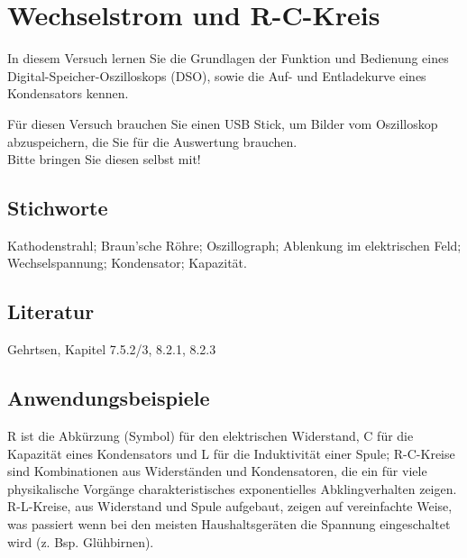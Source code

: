 \chapter{Wechselstrom und R-C-Kreis}
\label{v:15}

In diesem Versuch lernen Sie die Grundlagen der Funktion und Bedienung eines Digital-Speicher-Oszilloskops (DSO), sowie die Auf- und Entladekurve eines Kondensators kennen.

\begin{hint}
	Für diesen Versuch brauchen Sie einen USB Stick, um Bilder vom Oszilloskop abzuspeichern, die Sie für die Auswertung brauchen.\\
	Bitte bringen Sie diesen selbst mit!
\end{hint}

\section{Stichworte}

Kathodenstrahl; Braun'sche Röhre; Oszillograph; Ablenkung im elektrischen Feld; Wechselspannung; Kondensator; Kapazität.
%
\section{Literatur}

Gehrtsen, Kapitel 7.5.2/3, 8.2.1, 8.2.3
%
\section{Anwendungsbeispiele}

R ist die Abkürzung (Symbol) für den elektrischen Widerstand, C für die Kapazität eines Kondensators und L für die Induktivität einer Spule; R-C-Kreise sind Kombinationen aus Widerständen und Kondensatoren, die ein für viele physikalische Vorgänge charakteristisches exponentielles Abklingverhalten zeigen. R-L-Kreise, aus Widerstand und Spule aufgebaut, zeigen auf vereinfachte Weise, was passiert wenn bei den meisten Haushaltsgeräten die Spannung eingeschaltet wird (z. Bsp. Glühbirnen).\\

